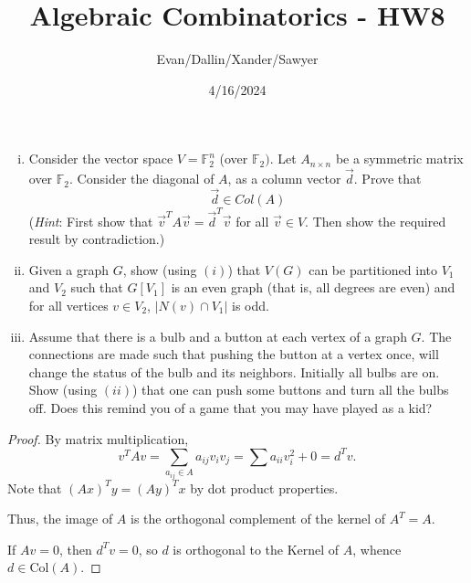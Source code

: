 \documentclass[11pt,letterpaper]{article}
\title{Algebraic Combinatorics - HW8}
\author{Evan/Dallin/Xander/Sawyer}
\date{4/16/2024}
\begin{document}
\maketitle
\begin{quest}[\textcolor{red}{Saving electricity through Linear Algebra and Graph Theory}]
    \begin{enumerate}[(i)]
        \item Consider the vector space $V=\mathbb{F}_2^n$ (over $\mathbb{F}_2)$. Let $A_{n\times n}$ be a symmetric matrix over $\mathbb{F}_2$. Consider the diagonal of $A$, as a column vector $\overrightarrow{d}$. Prove that 
        \[\vec{d}\in Col(A)\]
        (\textit{Hint}: First show that $\vec{v}^{T}A\vec{v}=\vec{d}^{T}\vec{v}$ for all $\vec{v}\in V$. Then show the required result by contradiction.)
        \item Given a graph $G$, show (using $(i)$) that $V(G)$ can be partitioned into $V_1$ and $V_2$ such that $G[V_1]$ is an even graph (that is, all degrees are even) and for all vertices $v\in V_2$, $|N(v)\cap V_1|$ is odd.
        \item Assume that there is a bulb and a button at each vertex of a graph $G$. The connections are made such that pushing the button at a vertex once, will change the status of the bulb and its neighbors. Initially all bulbs are on. Show (using $(ii)$) that one can push some buttons and turn all the bulbs off. Does this remind you of a game that you may have played as a kid?
    \end{enumerate}
\end{quest}
\begin{proof}
    By matrix multiplication, \[v^TAv=\sum_{a_{ij}\in A}a_{ij}v_iv_j=\sum a_{ii}v_i^2+0=d^Tv.\]
    Note that $(Ax)^Ty=(Ay)^Tx$ by dot product properties. 
    
    Thus, the image of $A$ is the orthogonal complement of the kernel of $A^T=A$.

    If $Av=0$, then $d^Tv=0$, so $d$ is orthogonal to the Kernel of $A$, whence $d\in \text{Col}(A)$.


\end{proof}
\end{document}
